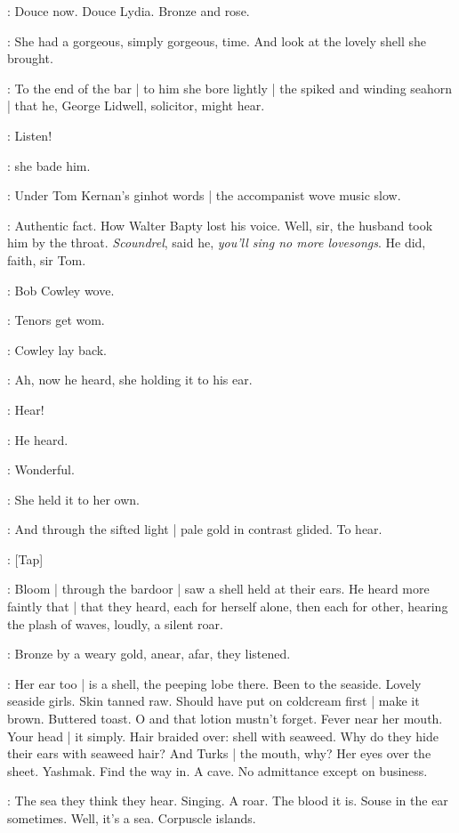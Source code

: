 :
Douce now.
Douce Lydia.
Bronze and rose.

:
She had a gorgeous,
simply gorgeous,
time.
And look at the lovely shell she brought.

:
To the end of the bar |
to him she bore lightly |
the spiked and winding seahorn |
that he,
George Lidwell,
solicitor,
might hear.

\MissD:
Listen!

:
she bade him.

:
Under Tom Kernan's ginhot words |
the accompanist wove music slow.

:
Authentic fact.
How Walter Bapty lost his voice.
Well, sir,
the husband took him by the throat.
\emph{Scoundrel},
said he,
\emph{you'll sing no more lovesongs}.
He did,
faith,
sir Tom.

:
Bob Cowley wove.

\BloomInt:
Tenors get wom.

:
Cowley lay back.

:
Ah,
now he heard,
she holding it to his ear.

\MissD:
Hear!

:
He heard.

\lidwell:
Wonderful.

:
She held it to her own.

:
And through the sifted light |
pale gold in contrast glided.
To hear.

\stripling:
[Tap]

:
Bloom |
through the bardoor |
saw a shell held at their ears.
He heard more faintly that |
that they heard,
each for herself alone,
then each for other,
hearing the plash of waves,
loudly,
a silent roar.

:
Bronze by a weary gold,
anear,
afar,
they listened.

\BloomInt:
Her ear too |
is a shell,
the peeping lobe there.
Been to the seaside.
Lovely seaside girls.
Skin tanned raw.
Should have put on coldcream first |
make it brown.
Buttered toast.
O and that lotion mustn't forget.
Fever near her mouth.
Your head |
it simply.
Hair braided over:
shell with seaweed.
Why do they hide their ears with seaweed hair?
And Turks |
the mouth,
why?
Her eyes over the sheet.
Yashmak.
Find the way in.
A cave.
No admittance except on business.

\BloomInt:
The sea they think they hear.
Singing.
A roar.
The blood it is.
Souse
in the ear sometimes.
Well,
it's a sea.
Corpuscle islands.

